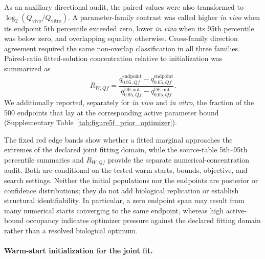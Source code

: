 \documentclass[11pt]{article}
\begin{document}
As an auxiliary directional audit, the paired values were also transformed to \(\log_2(Q_{\mathrm{vivo}}/Q_{\mathrm{vitro}})\). A parameter-family contrast was called higher \textit{in vivo} when its endpoint 5th percentile exceeded zero, lower \textit{in vivo} when its 95th percentile was below zero, and overlapping equality otherwise. Cross-family direction agreement required the same non-overlap classification in all three families. Paired-ratio fitted-solution concentration relative to initialization was summarized as
\begin{equation}
R_{W,Qf}
=
\frac{q_{0.95,Qf}^{\mathrm{endpoint}}-q_{0.05,Qf}^{\mathrm{endpoint}}}
{q_{0.95,Qf}^{\mathrm{DE\ init}}-q_{0.05,Qf}^{\mathrm{DE\ init}}}.
\label{eq:appendix_figure5f_width_ratio}
\end{equation}
We additionally reported, separately for \textit{in vivo} and \textit{in vitro}, the fraction of the 500 endpoints that lay at the corresponding active parameter bound (Supplementary Table~\ref{tab:figure5f_prior_optimizer}).

The fixed red edge bands show whether a fitted marginal approaches the extremes of the declared joint fitting domain, while the source-table 5th--95th percentile summaries and $R_{W,Qf}$ provide the separate numerical-concentration audit. Both are conditional on the tested warm starts, bounds, objective, and search settings. Neither the initial populations nor the endpoints are posterior or confidence distributions; they do not add biological replication or establish structural identifiability. In particular, a zero endpoint span may result from many numerical starts converging to the same endpoint, whereas high active-bound occupancy indicates optimizer pressure against the declared fitting domain rather than a resolved biological optimum.


\paragraph{Warm-start initialization for the joint fit.}
\end{document}
